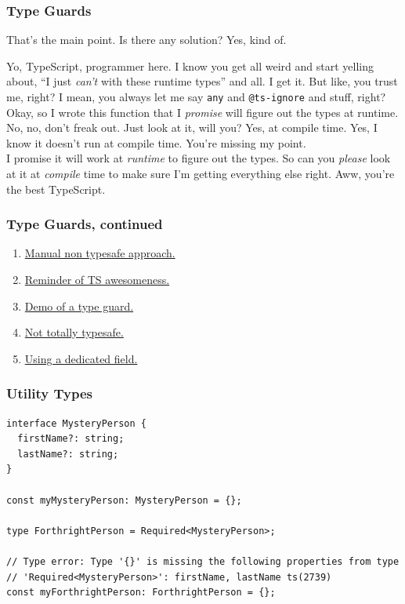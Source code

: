 \documentclass[aspectratio=169]{beamer}
\begin{document}
\begin{frame}[fragile]
  \frametitle{Type Guards}
  \small

  That's the main point. Is there any solution? Yes, kind of. \\

  \begin{tcolorbox}
    Yo, TypeScript, programmer here. I know you get all weird and start
    yelling about, ``I just \emph{can't} with these runtime types'' and all.
    I get it. But like, you trust me, right? I mean, you always let me say
    \texttt{any} and \texttt{@ts-ignore} and stuff, right? \\

    Okay, so I wrote this function that I \emph{promise} will figure out the
    types at runtime. No, no, don't freak out. Just look at it, will you?
    Yes, at compile time. Yes, I know it doesn't run at compile time. You're
    missing my point. \\

    I promise it will work at \emph{runtime} to figure out the types. So can
    you \textit{please} look at it at \emph{compile} time to make sure I'm
    getting everything else right. Aww, you're the best TypeScript.
  \end{tcolorbox}
\end{frame}

\begin{frame}[fragile]
  \frametitle{Type Guards, continued}

  \begin{enumerate}
    \item \href{https://bit.ly/3taav6c}{Manual non typesafe approach.}
    \item \href{https://bit.ly/3uNRsPJ}{Reminder of TS awesomeness.}
    \item \href{https://bit.ly/2OEFnNa}{Demo of a type guard.}
    \item \href{https://bit.ly/2RsdNnw}{Not totally typesafe.}
    \item \href{https://bit.ly/2RvwPt9}{Using a dedicated field.}
  \end{enumerate}
\end{frame}


\begin{frame}[fragile]
  \frametitle{Utility Types}

  \begin{verbatim}
interface MysteryPerson {
  firstName?: string;
  lastName?: string;
}

const myMysteryPerson: MysteryPerson = {};

type ForthrightPerson = Required<MysteryPerson>;

// Type error: Type '{}' is missing the following properties from type
// 'Required<MysteryPerson>': firstName, lastName ts(2739)
const myForthrightPerson: ForthrightPerson = {};
  \end{verbatim}
\end{frame}
\end{document}
